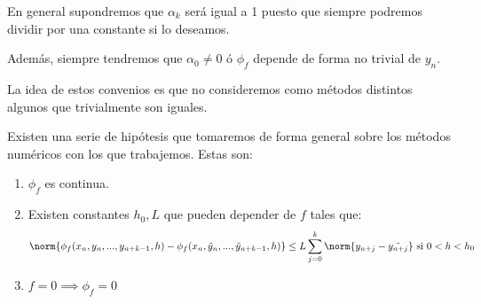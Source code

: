 \documentclass{apuntes}
\begin{document}
En general supondremos que  $α_k$ será igual a 1 puesto que siempre podremos dividir por una constante si lo deseamos.

Además, siempre tendremos que $α_0 \neq 0$ ó $\phi_f$ depende de forma no trivial de $y_n$.

La idea de estos convenios es que no consideremos como métodos distintos algunos que trivialmente son iguales.

\begin{prop}
Existen una serie de hipótesis que tomaremos de forma general sobre los métodos numéricos con los que trabajemos. Estas son:

\begin{enumerate}
\item $\phi_f$ es continua.

\item Existen constantes $h_0,L$ que pueden depender de $f$ tales que:
\[\norm{\phi_f(x_n,y_n,...,y_{n+k-1},h) - \phi_f(x_n,\tilde{y}_n,...,\tilde{y}_{n+k-1},h)}\leq L \sum_{j=0}^k \norm{y_{n+j}-\tilde{y_{n+j}}} \text{ si } 0 < h < h_0\]

\item $f= 0 \implies \phi_f=0$


\end{enumerate}
\end{prop}
\end{document}
